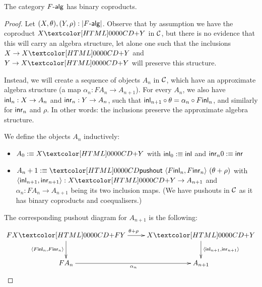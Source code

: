 \begin{proposition}
  \label{f-alg-coproducts}
  The category $\algcat{F}$ has binary coproducts.
\end{proposition}

\begin{proof}
  Let $(X,\theta),(Y,\rho) : | \algcat{F} |$. Observe that by
  assumption we have the coproduct $\coproduct{X}{Y}$ in $\mathcal{C}$, but there is no
  evidence that this will carry an algebra structure, let alone one
  such that the inclusions $X \to \coproduct{X}{Y}$ and $Y \to \coproduct{X}{Y}$ will
  preserve this structure.

  Instead, we will create a sequence of objects $A_n$ in $\mathcal{C}$, which
  have an approximate algebra structure (a map
  $\alpha_n : FA_n \to A_{n+1}$). For every $A_n$, we also have
  $\inln{n} : X \to A_n$ and $\inrn{n} : Y \to A_n$, such that
  $\inln{n+1} \circ \theta = \alpha_n \circ F \inl_{n}$, and similarly
  for $\inrn{n}$ and $\rho$. In other words: the inclusions preserve
  the approximate algebra structure.

  We define the objects $A_n$ inductively:
  \begin{itemize}
  \item $A_0 \ddefeq \coproduct{X}{Y}$ with $\inln{0} \ddefeq \ident{inl}$ and $\inrn{n}{0} \ddefeq \ident{inr}$
  \item
    $A_n+1 \ddefeq \pushout{\langle F \inln{n}, F \inrn{n}
      \rangle}{(\theta + \rho)}$
    with
    $\langle \inln{n+1}, \inrn{n+1} \rangle : \coproduct{X}{Y} \to
    A_{n+1}$
    and $\alpha_n : FA_n \to A_{n+1}$ being its two inclusion
    maps. (We have pushouts in $\mathcal{C}$ as it has binary coproducts and
    coequalisers.)
  \end{itemize}

  The corresponding pushout diagram for $A_{n+1}$ is the following:
  $$
  \xymatrix{
    \coproduct{FX}{FY} \ar[r]^{\theta + \rho} \ar[d]_{\langle F \inln{n} , F \inrn{n} \rangle} 
    &\coproduct{X}{Y} \ar[d]^{\langle \inln{n+1} , \inrn{n+1} \rangle} \\
    FA_n \ar[r]_{\alpha_n}
    &A_{n+1}
  }
  $$


\end{proof}

